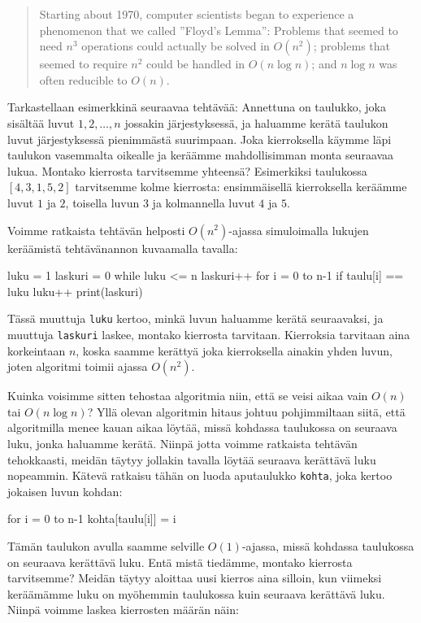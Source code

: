\begin{quote}
Starting about 1970, computer scientists began to experience
a phenomenon that we called ''Floyd's Lemma'':
Problems that seemed to need $n^3$ operations could actually be
solved in $O(n^2)$; problems that seemed to require $n^2$
could be handled in $O(n \log n)$; and $n \log n$ was often
reducible to $O(n)$.
\end{quote}

Tarkastellaan esimerkkinä seuraavaa tehtävää:
Annettuna on taulukko, joka sisältää luvut $1,2,\dots,n$
jossakin järjestyksessä,
ja haluamme kerätä taulukon luvut järjestyksessä pienimmästä suurimpaan.
Joka kierroksella käym\-me läpi taulukon vasemmalta
oikealle ja keräämme mahdollisimman monta seuraavaa lukua.
Montako kierrosta tarvitsemme yhteensä?
Esimerkiksi taulukossa $[4,3,1,5,2]$
tarvitsemme kolme kierrosta:
ensimmäisellä kierroksella keräämme luvut $1$ ja $2$,
toisella luvun $3$ ja kolmannella luvut $4$ ja $5$.

Voimme ratkaista tehtävän helposti $O(n^2)$-ajassa
simuloimalla lukujen keräämistä tehtävänannon kuvaamalla tavalla:

\begin{code}
luku = 1
laskuri = 0
while luku <= n
    laskuri++
    for i = 0 to n-1
        if taulu[i] == luku
            luku++
print(laskuri)
\end{code}

Tässä muuttuja \texttt{luku} kertoo,
minkä luvun haluamme kerätä seuraavaksi,
ja muuttuja \texttt{laskuri} laskee,
montako kierrosta tarvitaan.
Kierroksia tarvitaan aina korkeintaan $n$,
koska saamme kerättyä joka kierroksella
ainakin yhden luvun,
joten algoritmi toimii ajassa $O(n^2)$.

Kuinka voisimme sitten tehostaa algoritmia niin,
että se veisi aikaa vain $O(n)$ tai $O(n \log n)$?
Yllä olevan algoritmin hitaus johtuu pohjimmiltaan siitä,
että algoritmilla menee kauan aikaa löytää,
missä kohdassa taulukossa on seuraava luku,
jonka haluamme kerätä.
Niinpä jotta voimme ratkaista tehtävän tehokkaasti,
meidän täytyy jollakin tavalla löytää seuraava kerät\-tävä luku nopeammin.
Kätevä ratkaisu tähän on luoda aputaulukko \texttt{kohta},
joka kertoo jokaisen luvun kohdan:

\begin{code}
for i = 0 to n-1
    kohta[taulu[i]] = i
\end{code}

Tämän taulukon avulla saamme selville $O(1)$-ajassa,
missä kohdassa taulukossa on seuraava kerättävä luku.
Entä mistä tiedämme, montako kierrosta tarvitsemme?
Meidän täytyy aloittaa uusi kierros aina silloin,
kun viimeksi keräämämme luku on myöhemmin taulukossa
kuin seuraava kerättävä luku.
Niinpä voimme laskea kierrosten määrän näin:

